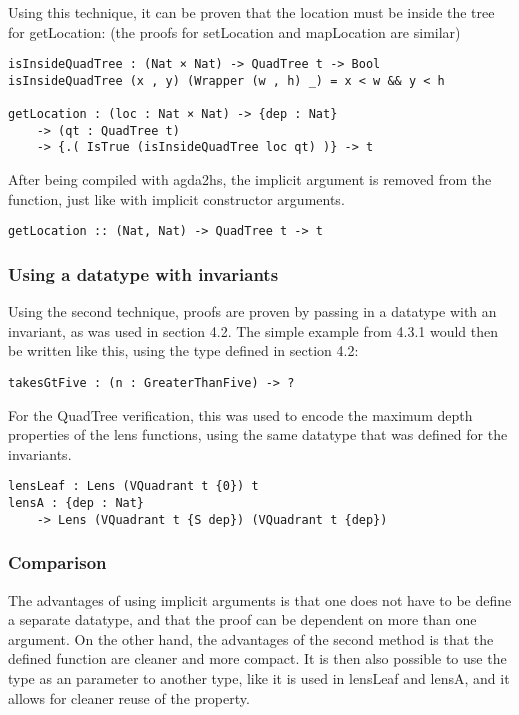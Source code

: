 Using this technique, it can be proven that the location must be inside the tree for getLocation: (the proofs for setLocation and mapLocation are similar)
\begin{verbatim}
isInsideQuadTree : (Nat × Nat) -> QuadTree t -> Bool
isInsideQuadTree (x , y) (Wrapper (w , h) _) = x < w && y < h

getLocation : (loc : Nat × Nat) -> {dep : Nat} 
    -> (qt : QuadTree t) 
    -> {.( IsTrue (isInsideQuadTree loc qt) )} -> t
\end{verbatim}
After being compiled with agda2hs, the implicit argument is removed from the function, just like with implicit constructor arguments.
\begin{verbatim}
getLocation :: (Nat, Nat) -> QuadTree t -> t
\end{verbatim}

\subsubsection{Using a datatype with invariants}
Using the second technique, proofs are proven by passing in a datatype with an invariant, as was used in section 4.2. The simple example from 4.3.1 would then be written like this, using the type defined in section 4.2:
\begin{verbatim}
takesGtFive : (n : GreaterThanFive) -> ?
\end{verbatim}

For the QuadTree verification, this was used to encode the maximum depth properties of the lens functions, using the same datatype that was defined for the invariants.
\begin{verbatim}
lensLeaf : Lens (VQuadrant t {0}) t
lensA : {dep : Nat} 
    -> Lens (VQuadrant t {S dep}) (VQuadrant t {dep})
\end{verbatim}

\subsubsection{Comparison}
The advantages of using implicit arguments is that one does not have to be define a separate datatype, and that the proof can be dependent on more than one argument. On the other hand, the advantages of the second method is that the defined function are cleaner and more compact. It is then also possible to use the type as an parameter to another type, like it is used in lensLeaf and lensA, and it allows for cleaner reuse of the property.

